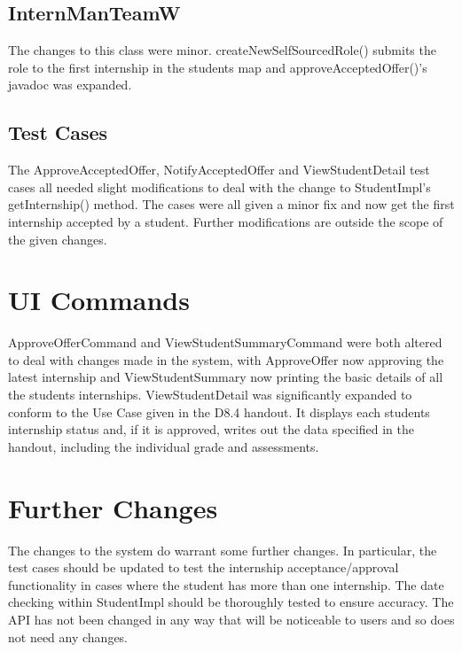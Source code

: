 \documentclass[11pt]{l3deliverable}
\begin{document}
\subsection{InternManTeamW}

The changes to this class were minor. createNewSelfSourcedRole() submits the role to
the first internship in the students map and approveAcceptedOffer()'s javadoc was 
expanded. 

\subsection{Test Cases}

The ApproveAcceptedOffer, NotifyAcceptedOffer and ViewStudentDetail test cases all 
needed slight modifications to deal with the change to StudentImpl's getInternship()
method. The cases were all given a minor fix and now get the first internship accepted
by a student. Further modifications are outside the scope of the given changes. 

\section{UI Commands}

ApproveOfferCommand and ViewStudentSummaryCommand were both altered to deal with 
changes made in the system, with ApproveOffer now approving the latest internship
and ViewStudentSummary now printing the basic details of all the students internships.
ViewStudentDetail was significantly expanded to conform to the Use Case given in the 
D8.4 handout. It displays each students internship status and, if it is approved, 
writes out the data specified in the handout, including the individual grade and 
assessments. 

\section{Further Changes}

The changes to the system do warrant some further changes. In particular, the test
cases should be updated to test the internship acceptance/approval functionality 
in cases where the student has more than one internship. The date checking within 
StudentImpl should be thoroughly tested to ensure accuracy. The API has not been 
changed in any way that will be noticeable to users and so does not need any changes.
\end{document}
